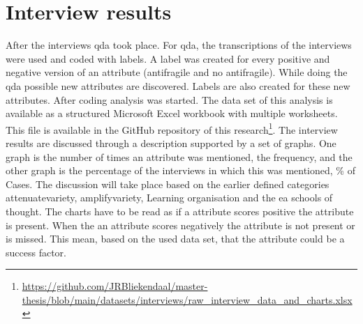 \section{Interview results}
After the interviews \acrfull{qda} took place. For \acrshort{qda}, the transcriptions of the interviews were used and coded with labels. A label was created for every positive and negative version of an \gls{attribute} (\gls{antifragile} and no \gls{antifragile}). While doing the \acrshort{qda} possible new \glspl{attribute} are discovered. Labels are also created for these new attributes. After coding analysis was started. The data set of this analysis is available as a structured Microsoft Excel workbook with multiple worksheets. This file is available in the GitHub repository of this research\footnote{\url{https://github.com/JRBliekendaal/master-thesis/blob/main/datasets/interviews/raw_interview_data_and_charts.xlsx}}. The interview results are discussed through a description supported by a set of graphs. One graph is the number of times an \gls{attribute} was mentioned, the frequency, and the other graph is the percentage of the interviews in which this was mentioned, \% of Cases. The discussion will take place based on the earlier defined categories \gls{attenuatevariety}, \gls{amplifyvariety}, Learning organisation and the \acrlong{ea} schools of thought. The charts have to be read as if a \gls{attribute} scores positive the \gls{attribute} is present. When the an \gls{attribute} scores negatively the \gls{attribute} is not present or is missed. This mean, based on the used data set, that the \gls{attribute} could be a success factor.
